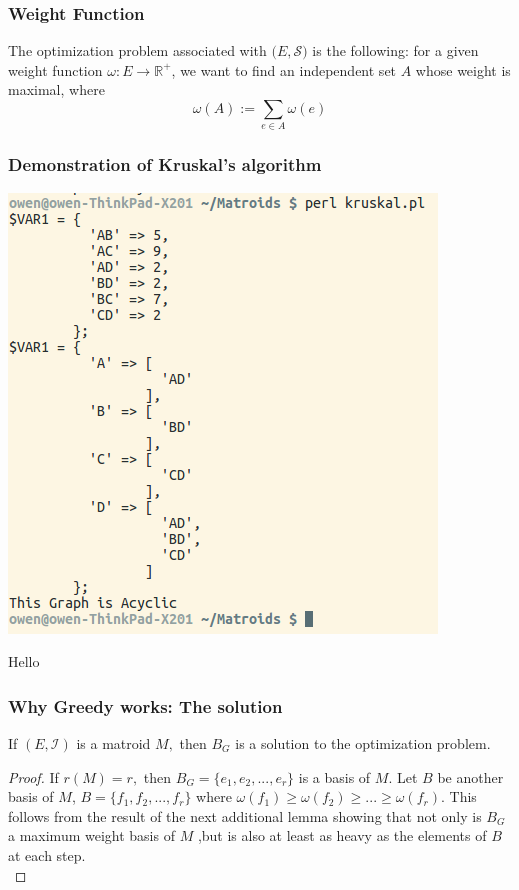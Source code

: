 \documentclass{beamer}
\begin{document}
\begin{frame}
\frametitle{Weight Function}
The optimization problem associated with $(E,\mathcal{S)}$ is the following: for a given weight function $\omega : E \rightarrow \mathbb{R^{+}}$, we want to find an independent set $A$ whose weight is maximal, where
\begin{equation}
\omega(A) := \sum_{e \in A} \omega (e)
\end{equation}

\end{frame}

\begin{frame}
\frametitle{Demonstration of Kruskal's algorithm}
\begin{minipage}{.4\textwidth}
\includegraphics[scale=0.4]{kruskal}
\end{minipage}
\hspace{6mm} \begin{minipage}{.4\textwidth}
Hello
\end{minipage}
\end{frame}

\begin{frame}
\frametitle{Why Greedy works: The solution}
\begin{lemma}
If $(E,\mathcal{I})$ is a matroid $M,$ then $B_G$ is a solution to the optimization problem.
\end{lemma}
\begin{proof}
If $r(M) = r,$ then $B_G = \{e_1,e_2, ..., e_r\}$ is a basis of $M.$ Let $B$ be another basis of $M$, $B = \{f_1, f_2, ..., f_r\}$
where $\omega(f_1) \geq \omega(f_2) \geq ... \geq \omega(f_r).$ This follows from the result of the next additional lemma showing that not only is $B_G$ a maximum weight basis of $M$ ,but is also at least as heavy as the elements of $B$ at each step.\\
\end{proof}
\end{frame}
\end{document}
